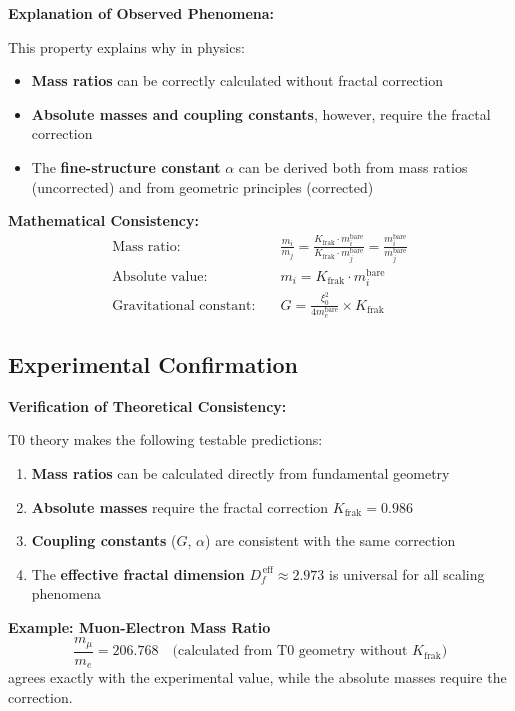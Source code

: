 	\begin{derivation}
		\textbf{Explanation of Observed Phenomena:}
		
		This property explains why in physics:
		
		\begin{itemize}
			\item \textbf{Mass ratios} can be correctly calculated without fractal correction
			\item \textbf{Absolute masses and coupling constants}, however, require the fractal correction
			\item The \textbf{fine-structure constant} $\alpha$ can be derived both from mass ratios (uncorrected) and from geometric principles (corrected)
		\end{itemize}
		
		\textbf{Mathematical Consistency:}
		\begin{align}
			\text{Mass ratio:} &\quad \frac{m_i}{m_j} = \frac{K_{\text{frak}} \cdot m_i^{\text{bare}}}{K_{\text{frak}} \cdot m_j^{\text{bare}}} = \frac{m_i^{\text{bare}}}{m_j^{\text{bare}}} \\
			\text{Absolute value:} &\quad m_i = K_{\text{frak}} \cdot m_i^{\text{bare}} \\
			\text{Gravitational constant:} &\quad G = \frac{\xi_0^2}{4 m_e^{\text{bare}}} \times K_{\text{frak}}
		\end{align}
	\end{derivation}
	
	\subsection{Experimental Confirmation}
	
	\begin{verification}
		\textbf{Verification of Theoretical Consistency:}
		
		T0 theory makes the following testable predictions:
		
		\begin{enumerate}
			\item \textbf{Mass ratios} can be calculated directly from fundamental geometry
			\item \textbf{Absolute masses} require the fractal correction $K_{\text{frak}} = 0.986$
			\item \textbf{Coupling constants} ($G$, $\alpha$) are consistent with the same correction
			\item The \textbf{effective fractal dimension} $D_f^{\,\text{eff}} \approx 2.973$ is universal for all scaling phenomena
		\end{enumerate}
		
		\textbf{Example: Muon-Electron Mass Ratio}
		\begin{equation}
			\frac{m_\mu}{m_e} = 206.768 \quad \text{(calculated from T0 geometry without $K_{\text{frak}}$)}
		\end{equation}
		agrees exactly with the experimental value, while the absolute masses require the correction.
	\end{verification}
	
